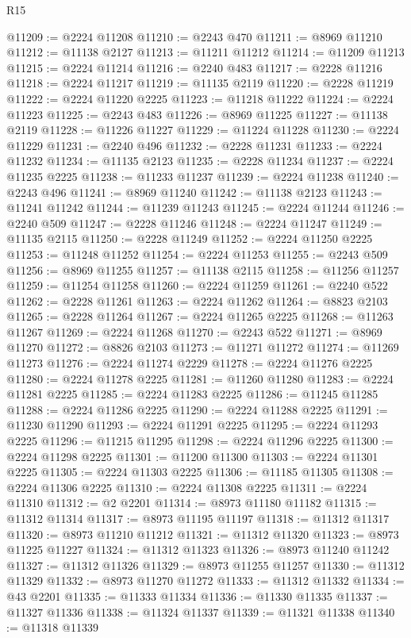 \begin{lexlean}{R15}
\begin{coremodule}
@11209 := @2224 @11208
@11210 := @2243 @470
@11211 := @8969 @11210
@11212 := @11138 @2127
@11213 := @11211 @11212
@11214 := @11209 @11213
@11215 := @2224 @11214
@11216 := @2240 @483
@11217 := @2228 @11216
@11218 := @2224 @11217
@11219 := @11135 @2119
@11220 := @2228 @11219
@11222 := @2224 @11220 @2225
@11223 := @11218 @11222
@11224 := @2224 @11223
@11225 := @2243 @483
@11226 := @8969 @11225
@11227 := @11138 @2119
@11228 := @11226 @11227
@11229 := @11224 @11228
@11230 := @2224 @11229
@11231 := @2240 @496
@11232 := @2228 @11231
@11233 := @2224 @11232
@11234 := @11135 @2123
@11235 := @2228 @11234
@11237 := @2224 @11235 @2225
@11238 := @11233 @11237
@11239 := @2224 @11238
@11240 := @2243 @496
@11241 := @8969 @11240
@11242 := @11138 @2123
@11243 := @11241 @11242
@11244 := @11239 @11243
@11245 := @2224 @11244
@11246 := @2240 @509
@11247 := @2228 @11246
@11248 := @2224 @11247
@11249 := @11135 @2115
@11250 := @2228 @11249
@11252 := @2224 @11250 @2225
@11253 := @11248 @11252
@11254 := @2224 @11253
@11255 := @2243 @509
@11256 := @8969 @11255
@11257 := @11138 @2115
@11258 := @11256 @11257
@11259 := @11254 @11258
@11260 := @2224 @11259
@11261 := @2240 @522
@11262 := @2228 @11261
@11263 := @2224 @11262
@11264 := @8823 @2103
@11265 := @2228 @11264
@11267 := @2224 @11265 @2225
@11268 := @11263 @11267
@11269 := @2224 @11268
@11270 := @2243 @522
@11271 := @8969 @11270
@11272 := @8826 @2103
@11273 := @11271 @11272
@11274 := @11269 @11273
@11276 := @2224 @11274 @2229
@11278 := @2224 @11276 @2225
@11280 := @2224 @11278 @2225
@11281 := @11260 @11280
@11283 := @2224 @11281 @2225
@11285 := @2224 @11283 @2225
@11286 := @11245 @11285
@11288 := @2224 @11286 @2225
@11290 := @2224 @11288 @2225
@11291 := @11230 @11290
@11293 := @2224 @11291 @2225
@11295 := @2224 @11293 @2225
@11296 := @11215 @11295
@11298 := @2224 @11296 @2225
@11300 := @2224 @11298 @2225
@11301 := @11200 @11300
@11303 := @2224 @11301 @2225
@11305 := @2224 @11303 @2225
@11306 := @11185 @11305
@11308 := @2224 @11306 @2225
@11310 := @2224 @11308 @2225
@11311 := @2224 @11310
@11312 := @2 @2201
@11314 := @8973 @11180 @11182
@11315 := @11312 @11314
@11317 := @8973 @11195 @11197
@11318 := @11312 @11317
@11320 := @8973 @11210 @11212
@11321 := @11312 @11320
@11323 := @8973 @11225 @11227
@11324 := @11312 @11323
@11326 := @8973 @11240 @11242
@11327 := @11312 @11326
@11329 := @8973 @11255 @11257
@11330 := @11312 @11329
@11332 := @8973 @11270 @11272
@11333 := @11312 @11332
@11334 := @43 @2201
@11335 := @11333 @11334
@11336 := @11330 @11335
@11337 := @11327 @11336
@11338 := @11324 @11337
@11339 := @11321 @11338
@11340 := @11318 @11339

\end{coremodule}
\end{lexlean}
